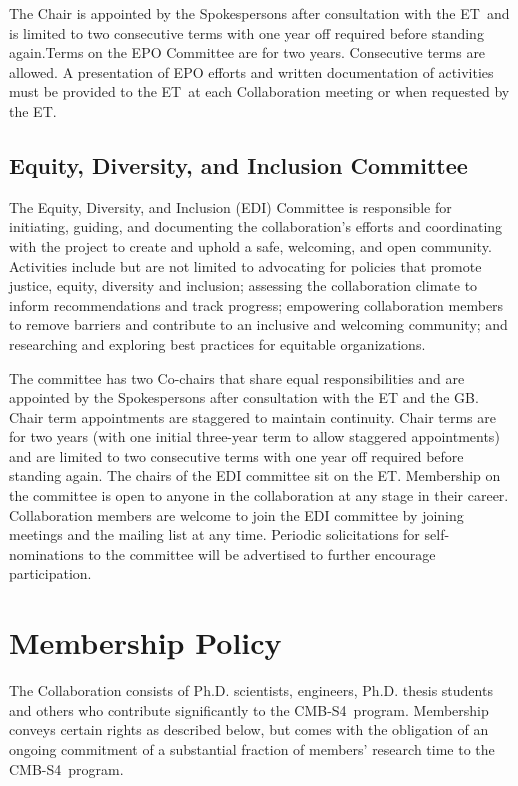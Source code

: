 \documentclass[12pt]{article}
\newcommand{\exec}{{Executive Team}}
\newcommand{\shorte}{{ET}}  %
\newcommand\collabname{CMB-S4}
\begin{document}
The Chair is appointed by the Spokespersons after consultation with the \shorte\  and is limited to two consecutive terms with one year off required before standing again.Terms on the EPO Committee are for two years. Consecutive terms are allowed.  A presentation of EPO efforts and written documentation of activities must be provided to the \shorte\ at each Collaboration meeting or when requested by the \shorte.

\subsection{Equity, Diversity, and Inclusion Committee}
The Equity, Diversity, and Inclusion (EDI) Committee is responsible for initiating, guiding, and documenting the collaboration's efforts and coordinating with the project to create and uphold a safe, welcoming, and open community. Activities include but are not limited to advocating for policies that promote justice, equity, diversity and inclusion; assessing the collaboration climate to inform recommendations and track progress; empowering collaboration members to remove barriers and contribute to an inclusive and welcoming community; and researching and exploring best practices for equitable organizations.

The committee has two Co-chairs that share equal responsibilities and are appointed by the Spokespersons after consultation with the ET and the GB. Chair term appointments are staggered to maintain continuity. Chair terms are for two years (with one initial three-year term to allow staggered appointments) and are limited to two consecutive terms with one year off required before standing again. The chairs of the EDI committee sit on the ET. Membership on the committee is open to anyone in the collaboration at any stage in their career. Collaboration members are welcome to join the EDI committee by joining meetings and the mailing list at any time. Periodic solicitations for self-nominations to the committee will be advertised to further encourage participation.

\section{Membership Policy}

The Collaboration consists of Ph.D. scientists, engineers, Ph.D. thesis students and others who contribute significantly to the \collabname\ program. Membership conveys certain rights as described below, but comes with the obligation of an ongoing commitment of a substantial fraction of members' research time to the \collabname\ program.
\end{document}
